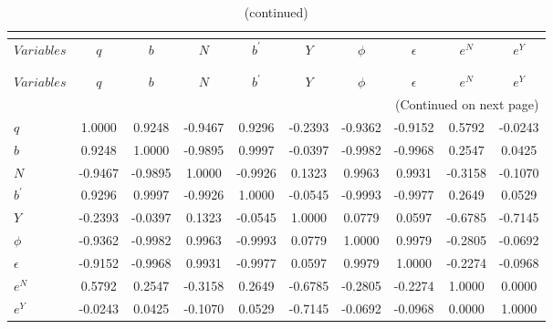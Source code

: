  
\begin{center}
\begin{longtable}{lccccccccc} 
\caption{MATRIX OF CORRELATIONS}\\
 \label{Table:th_corr_matrix}\\
\toprule 
$Variables  $	 & 	 $           q$	 & 	 $           b$	 & 	 $           N$	 & 	 $   b^\prime$	 & 	 $           Y$	 & 	 $       \phi$	 & 	 $   \epsilon$	 & 	 $         e^N$	 & 	 $         e^Y$\\
\midrule \endfirsthead 
\caption{(continued)}\\
 \toprule \\ 
$Variables  $	 & 	 $           q$	 & 	 $           b$	 & 	 $           N$	 & 	 $   b^\prime$	 & 	 $           Y$	 & 	 $       \phi$	 & 	 $   \epsilon$	 & 	 $         e^N$	 & 	 $         e^Y$\\
\midrule \endhead 
\midrule \multicolumn{10}{r}{(Continued on next page)} \\ \bottomrule \endfoot 
\bottomrule \endlastfoot 
$q          $	 & 	      1.0000	 & 	      0.9248	 & 	     -0.9467	 & 	      0.9296	 & 	     -0.2393	 & 	     -0.9362	 & 	     -0.9152	 & 	      0.5792	 & 	     -0.0243 \\ 
$b          $	 & 	      0.9248	 & 	      1.0000	 & 	     -0.9895	 & 	      0.9997	 & 	     -0.0397	 & 	     -0.9982	 & 	     -0.9968	 & 	      0.2547	 & 	      0.0425 \\ 
$N          $	 & 	     -0.9467	 & 	     -0.9895	 & 	      1.0000	 & 	     -0.9926	 & 	      0.1323	 & 	      0.9963	 & 	      0.9931	 & 	     -0.3158	 & 	     -0.1070 \\ 
$b^\prime   $	 & 	      0.9296	 & 	      0.9997	 & 	     -0.9926	 & 	      1.0000	 & 	     -0.0545	 & 	     -0.9993	 & 	     -0.9977	 & 	      0.2649	 & 	      0.0529 \\ 
$Y          $	 & 	     -0.2393	 & 	     -0.0397	 & 	      0.1323	 & 	     -0.0545	 & 	      1.0000	 & 	      0.0779	 & 	      0.0597	 & 	     -0.6785	 & 	     -0.7145 \\ 
$\phi       $	 & 	     -0.9362	 & 	     -0.9982	 & 	      0.9963	 & 	     -0.9993	 & 	      0.0779	 & 	      1.0000	 & 	      0.9979	 & 	     -0.2805	 & 	     -0.0692 \\ 
$\epsilon   $	 & 	     -0.9152	 & 	     -0.9968	 & 	      0.9931	 & 	     -0.9977	 & 	      0.0597	 & 	      0.9979	 & 	      1.0000	 & 	     -0.2274	 & 	     -0.0968 \\ 
$e^N        $	 & 	      0.5792	 & 	      0.2547	 & 	     -0.3158	 & 	      0.2649	 & 	     -0.6785	 & 	     -0.2805	 & 	     -0.2274	 & 	      1.0000	 & 	      0.0000 \\ 
$e^Y        $	 & 	     -0.0243	 & 	      0.0425	 & 	     -0.1070	 & 	      0.0529	 & 	     -0.7145	 & 	     -0.0692	 & 	     -0.0968	 & 	      0.0000	 & 	      1.0000 \\ 
\end{longtable}
 \end{center}

